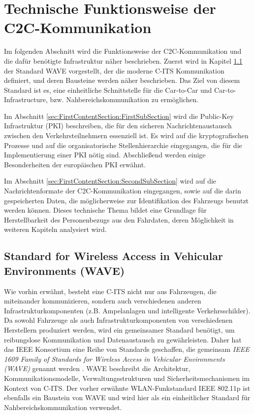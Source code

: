 
\section{Technische  Funktionsweise der C2C-Kommunikation}
\label{ch:FirstContentSection}

Im folgenden Abschnitt wird die Funktionsweise der C2C-Kommunikation und die dafür benötigte Infrastruktur näher beschrieben. Zuerst wird in Kapitel \ref{sec:FirstContentSection:ZeroSubSection} der Standard WAVE vorgestellt, der die moderne C-ITS Kommunikation definiert, und deren Bausteine werden näher beschrieben. Das Ziel von diesem Standard ist es, eine einheitliche Schnittstelle für die Car-to-Car und Car-to-Infrastructure, bzw. Nahbereichskommunikation zu ermöglichen.

Im Abschnitt \ref{sec:FirstContentSection:FirstSubSection} wird die Public-Key Infrastruktur (PKI) beschreiben, die für den sicheren Nachrichtenaustausch zwischen den Verkehrsteilnehmern essenziell ist. Es wird auf die kryptografischen Prozesse und auf die organisatorische Stellenhierarchie eingegangen, die für die Implementierung einer PKI nötig sind. Abschließend werden einige Besonderheiten der europäischen PKI erwähnt.

Im Abschnitt \ref{sec:FirstContentSection:SecondSubSection} wird auf die Nachrichtenformate der C2C-Kommunikation eingegangen, sowie auf die darin gespeicherten Daten, die möglicherweise zur Identifikation des Fahrzeugs benutzt werden können. Dieses technische Thema bildet eine Grundlage für Herstellbarkeit des Personenbezugs aus den Fahrdaten, deren Möglichkeit in weiteren Kapiteln analysiert wird.

\subsection{Standard for Wireless Access in Vehicular Environments (WAVE)}
\label{sec:FirstContentSection:ZeroSubSection}

Wie vorhin erwähnt, besteht eine C-ITS nicht nur aus Fahrzeugen, die miteinander kommunizieren, sondern auch verschiedenen anderen Infrastrukturkomponenten (z.B. Ampelanlagen und intelligente Verkehrsschilder). Da sowohl Fahrzeuge als auch Infrastrukturkomponenten von verschiedenen Herstellern produziert werden, wird ein gemeinsamer Standard benötigt, um reibungslose Kommunikation und Datenaustausch zu gewährleisten. Daher hat das IEEE Konsortium eine Reihe von Standards geschaffen, die gemeinsam \emph{IEEE 1609 Family of Standards for Wireless Access in Vehicular Environments (WAVE)} genannt werden \cite{WAVE}. WAVE beschreibt die Architektur, Kommunikationsmodelle, Verwaltungsstrukturen und Sicherheitsmechanismen im Kontext von C-ITS. Der vorher erwähnte WLAN-Funkstandard IEEE 802.11p ist ebenfalls ein Baustein von WAVE und wird hier als ein einheitlicher Standard für Nahbereichskommunikation verwendet. 

